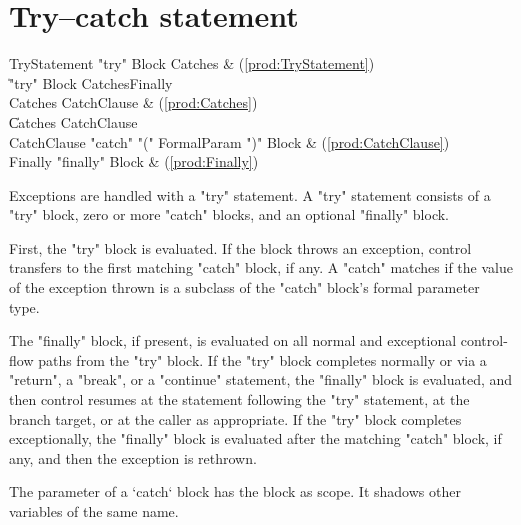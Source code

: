 \section{Try--catch statement}

\begin{bbgrammar}
        TryStatement \: \xcd"try" Block Catches & (\ref{prod:TryStatement}) \\
                    \| \xcd"try" Block Catches\opt Finally \\
             Catches \: CatchClause & (\ref{prod:Catches}) \\
                    \| Catches CatchClause \\
         CatchClause \: \xcd"catch" \xcd"(" FormalParam \xcd")" Block & (\ref{prod:CatchClause}) \\
             Finally \: \xcd"finally" Block & (\ref{prod:Finally}) \\
\end{bbgrammar}

Exceptions are handled with a \xcd"try" statement.
A \xcd"try" statement consists of a \xcd"try" block, zero or more
\xcd"catch" blocks, and an optional \xcd"finally" block.

First, the \xcd"try" block is evaluated.  If the block throws an
exception, control transfers to the first matching \xcd"catch"
block, if any.  A \xcd"catch" matches if the value of the
exception thrown is a subclass of the \xcd"catch" block's formal
parameter type.

The \xcd"finally" block, if present, is evaluated on all normal
and exceptional control-flow paths from the \xcd"try" block.
If the \xcd"try" block completes normally
or via a \xcd"return", a \xcd"break", or a
\xcd"continue" statement, 
the \xcd"finally"
block is evaluated, and then control resumes at
the statement following the \xcd"try" statement, at the branch target, or at
the caller as appropriate.
If the \xcd"try" block completes
exceptionally, the \xcd"finally" block is evaluated after the
matching \xcd"catch" block, if any, and then the
exception is rethrown.


The parameter of a \xcd`catch` block has the block as scope.  It shadows other
variables of the same name.

